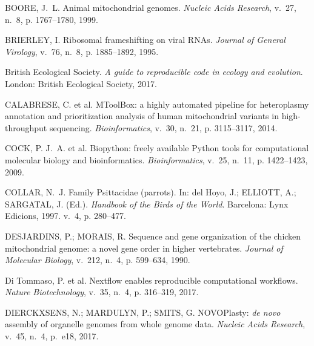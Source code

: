 \begin{thebibliography}{}
{BOORE, J.~L. Animal mitochondrial genomes.
\emph{Nucleic Acids Research}, v.~27, n.~8, p. 1767--1780, 1999.}

{BRIERLEY, I. Ribosomal frameshifting on viral {RNAs}.
\emph{Journal of General Virology}, v.~76, n.~8, p. 1885--1892, 1995.}

{{British Ecological Society}. \emph{A guide to reproducible code in ecology
  and evolution}. London: British Ecological Society, 2017.}

{CALABRESE, C. et al. {MToolBox}: a highly automated pipeline for heteroplasmy
  annotation and prioritization analysis of human mitochondrial variants in
  high-throughput sequencing.
\emph{Bioinformatics}, v.~30, n.~21, p. 3115--3117, 2014.}

{COCK, P. J.~A. et al. Biopython: freely available {P}ython tools for
  computational molecular biology and bioinformatics.
\emph{Bioinformatics}, v.~25, n.~11, p. 1422--1423, 2009.}

{COLLAR, N.~J. Family {P}sittacidae (parrots). In:  {del Hoyo}, J.; ELLIOTT,
  A.; SARGATAL, J. (Ed.). \emph{Handbook of the Birds of the World}. Barcelona:
  Lynx Edicions, 1997. v.~4, p. 280--477.}

{DESJARDINS, P.; MORAIS, R. Sequence and gene organization of the chicken
  mitochondrial genome: a novel gene order in higher vertebrates.
\emph{Journal of Molecular Biology}, v.~212, n.~4, p. 599--634, 1990.}

{{Di Tommaso}, P. et al. Nextflow enables reproducible computational workflows.
\emph{Nature Biotechnology}, v.~35, n.~4, p. 316--319, 2017.}

{DIERCKXSENS, N.; MARDULYN, P.; SMITS, G. {NOVOPlasty}: \textit{de novo}
  assembly of organelle genomes from whole genome data.
\emph{Nucleic Acids Research}, v.~45, n.~4, p.~e18, 2017.}


\end{thebibliography}
